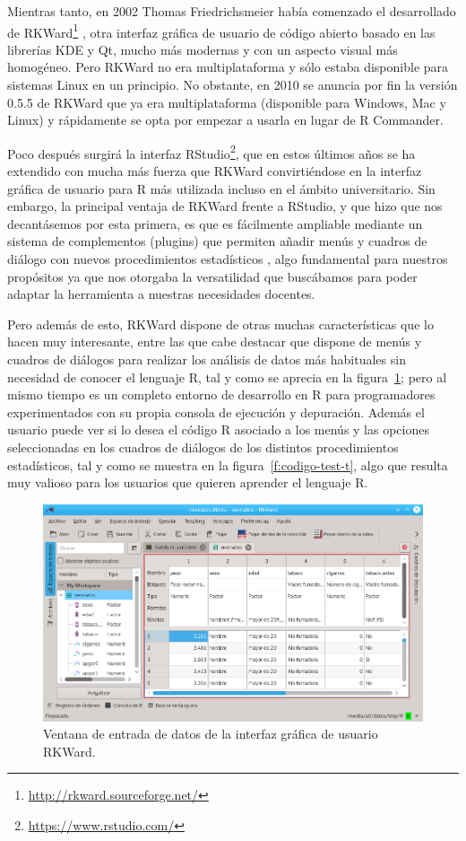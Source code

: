 \documentclass[a4paper,10pt,twoside]{article}
\newcommand{\rkward}{\textsf{RKWard}}
\newcommand{\rcommander}{\textsf{R Commander}}
\begin{document}
Mientras tanto, en 2002 Thomas Friedrichsmeier había comenzado el desarrollado de
\rkward{}\footnote{\url{http://rkward.sourceforge.net/}} \cite{rodiger2012rkward}, otra interfaz gráfica de usuario de
código abierto basado en las librerías KDE y Qt, mucho más modernas y con un aspecto visual más homogéneo.
Pero \rkward{} no era multiplataforma y sólo estaba disponible para sistemas Linux en un principio.
No obstante, en 2010 se anuncia por fin la versión 0.5.5 de \rkward{} que ya era multiplataforma (disponible para
Windows, Mac y Linux) y rápidamente se opta por empezar a usarla en lugar de \rcommander{}.

Poco después surgirá la interfaz \textsf{RStudio}\footnote{\url{https://www.rstudio.com/}}, que en estos últimos
años se ha extendido con mucha más fuerza que \rkward{} convirtiéndose en la interfaz gráfica de usuario para R más
utilizada incluso en el ámbito universitario.
Sin embargo, la principal ventaja de \rkward{} frente a \textsf{RStudio}, y que hizo que nos decantásemos por esta
primera, es que es fácilmente ampliable mediante un sistema de complementos (plugins) que permiten añadir menús y
cuadros de diálogo con nuevos procedimientos estadísticos \cite{friedrichsmeier2011introduction}, algo fundamental para
nuestros propósitos ya que nos otorgaba la versatilidad que buscábamos para poder adaptar la herramienta a nuestras
necesidades docentes.

Pero además de esto, \rkward{} dispone de otras muchas características que lo hacen muy interesante, entre las que cabe
destacar que dispone de menús y cuadros de diálogos para realizar los análisis de datos más habituales sin necesidad de
conocer el lenguaje R, tal y como se aprecia en la figura~\ref{f:ventana-datos-rkward}; pero al mismo tiempo es un
completo entorno de desarrollo en R para programadores experimentados con su propia consola de ejecución y depuración.
Además el usuario puede ver si lo desea el código R asociado a los menús y las opciones seleccionadas en los
cuadros de diálogos de los distintos procedimientos estadísticos, tal y como se muestra en la
figura~\ref{f:codigo-test-t}, algo que resulta muy valioso para los usuarios que quieren aprender el lenguaje R.

\begin{figure}[htbp!]
\centering
\includegraphics[width=\textwidth]{img/ventana_datos_rkward.png}
\caption{Ventana de entrada de datos de la interfaz gráfica de usuario \rkward{}.}
\label{f:ventana-datos-rkward}
\end{figure}
\end{document}
